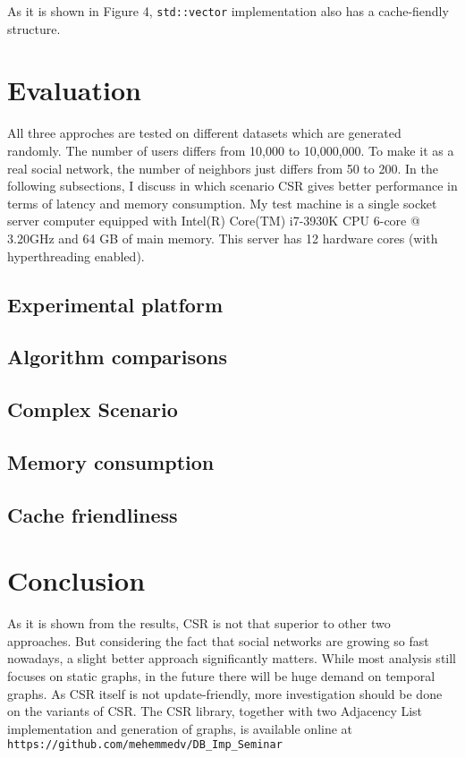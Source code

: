 \documentclass{article}
\begin{document}
As it is shown in Figure 4, \texttt{std::vector} implementation also has a cache-fiendly structure.

\section{Evaluation}
All three approches are tested on different datasets which are generated randomly. The number of users differs from 10,000 to 10,000,000. To make it as a real social network, the number of neighbors just differs from 50 to 200. In the following subsections, I discuss in which scenario CSR gives better performance in terms of latency and memory consumption. My test machine is a single socket server computer equipped with Intel(R) Core(TM) i7-3930K CPU 6-core @ 3.20GHz and 64 GB of main memory. This server has 12 hardware cores (with hyperthreading enabled).
\subsection{Experimental platform}

\subsection{Algorithm comparisons}

\subsection{Complex Scenario}

\subsection{Memory consumption}

\subsection{Cache friendliness}

\section{Conclusion}
As it is shown from the results, CSR is not that superior to other two approaches. But considering the fact that social networks are growing so fast nowadays, a slight better approach significantly matters. While most analysis still focuses on static graphs, in the future there will be huge demand on temporal graphs. As CSR itself is not update-friendly, more investigation should be done on the variants of CSR. The CSR library, together with two Adjacency List implementation and generation of graphs, is available online at \texttt{https://github.com/mehemmedv/DB\_Imp\_Seminar}\\

\end{document}
